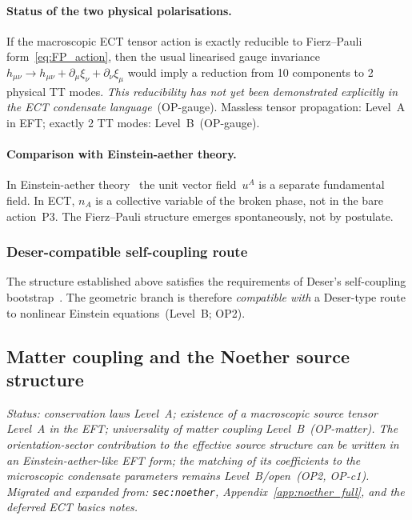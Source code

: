 \documentclass[11pt,a4paper]{article}
\numberwithin{equation}{section}
\begin{document}
\paragraph{Status of the two physical polarisations.}
If the macroscopic ECT tensor action is exactly reducible to
Fierz--Pauli form~\eqref{eq:FP_action}, then the usual linearised
gauge invariance
$h_{\mu\nu}\to h_{\mu\nu}+\partial_\mu\xi_\nu+\partial_\nu\xi_\mu$
would imply a reduction from 10 components to 2 physical TT modes.
\emph{This reducibility has not yet been demonstrated explicitly
in the ECT condensate language}~(OP-gauge).
Massless tensor propagation: Level~A in EFT;
exactly 2 TT modes: Level~B~(OP-gauge).

\paragraph{Comparison with Einstein-aether theory.}
In Einstein-aether theory~\cite{Jacobson2004} the unit vector
field~$u^A$ is a separate fundamental field.
In ECT, $n_A$ is a collective variable of the broken phase, not
in the bare action~P3.
The Fierz--Pauli structure emerges spontaneously, not by postulate.

\subsubsection*{Deser-compatible self-coupling route}

The structure established above satisfies the requirements of
Deser's self-coupling bootstrap~\cite{Deser1970}.
The geometric branch is therefore \emph{compatible with} a
Deser-type route to nonlinear Einstein equations~(Level~B; OP2).


\subsection{Matter coupling and the Noether source structure}
\label{sec:mp_noether}

\textit{Status: conservation laws Level~A; existence of a macroscopic
source tensor Level~A in the EFT; universality of matter coupling
Level~B~(OP-matter). The orientation-sector contribution to the
effective source structure can be written in an Einstein-aether-like
EFT form; the matching of its coefficients to the microscopic
condensate parameters remains Level~B/open~(OP2, OP-c1).
Migrated and expanded from: \texttt{sec:noether},
Appendix~\ref{app:noether_full}, and the deferred ECT basics notes.}
\end{document}
